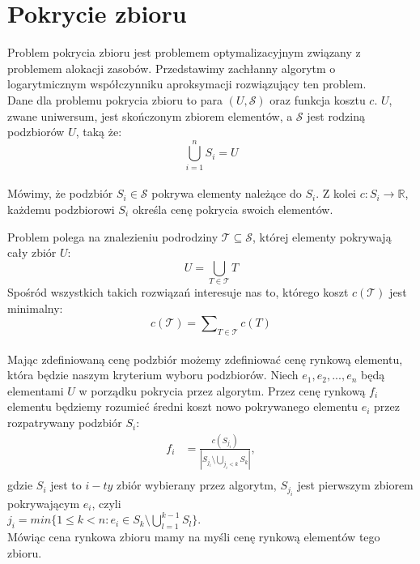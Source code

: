 \section{Pokrycie zbioru}

\label{sec:pokrycie}

Problem pokrycia zbioru jest problemem optymalizacyjnym związany z problemem alokacji zasobów. 
Przedstawimy zachłanny algorytm o logarytmicznym współczynniku aproksymacji rozwiązujący ten problem.\\

Dane dla problemu pokrycia zbioru to para $(U,\mathcal{S})$ oraz funkcja kosztu $c$. $U$, zwane uniwersum, jest skończonym zbiorem elementów, a $\mathcal{S}$ jest rodziną podzbiorów $U$, taką że:\\
\[ \bigcup\limits_{i=1}^{n} S_{i} = U \] \\
Mówimy, że podzbiór $S_{i} \in \mathcal{S}$ pokrywa elementy należące do $S_{i}$. 
Z kolei $c: S_{i} \rightarrow \mathbb{R} $, każdemu podzbiorowi $S_{i}$ określa cenę pokrycia swoich elementów.

Problem polega na znalezieniu podrodziny $\mathcal{T} \subseteq \mathcal{S}$, której elementy pokrywają cały zbiór $U$:
\[ U = \bigcup_{T \in \mathcal{T}} T \]  
Spośród wszystkich takich rozwiązań interesuje nas to, którego koszt $c(\mathcal{T})$ jest minimalny:
\[ c(\mathcal{T}) = \sum\nolimits_{T \in \mathcal{T}} c(T) \]  \\

Mając zdefiniowaną cenę podzbiór możemy zdefiniować cenę rynkową elementu, która będzie naszym kryterium wyboru podzbiorów.
Niech $e_{1}, e_{2}, ... , e_{n}$ będą elementami $U$ w porządku pokrycia przez algorytm.
Przez cenę rynkową $f_{i}$ elementu będziemy rozumieć średni koszt nowo pokrywanego elementu $e_{i}$ przez rozpatrywany podzbiór $S_{i}$: \\
\begin{align*}
f_{i} &= \frac{c(S_{j_i})}{\left|S_{j_i} \setminus \bigcup_{j_{i} < k} S_{k} \right|},\\
\end{align*}
gdzie $S_{i}$ jest to $i-ty$ zbiór wybierany przez algorytm, $S_{j_i}$ jest pierwszym zbiorem pokrywającym $e_{i}$, czyli\\ $j_{i} = min \bigg\{ 1 \leq k < n : e_i \in S_k \setminus \bigcup\limits_{l=1}^{k-1} S_{l}  \bigg\}$.\\
Mówiąc cena rynkowa zbioru mamy na myśli cenę rynkową elementów tego zbioru.\\


